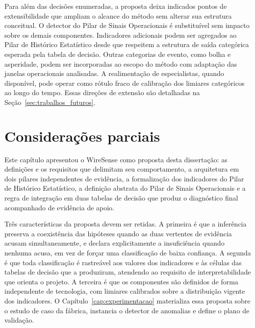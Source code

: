 Para além das decisões enumeradas, a proposta deixa indicados pontos de extensibilidade que ampliam o alcance do método sem alterar sua estrutura conceitual. O detector do Pilar de Sinais Operacionais é substituível sem impacto sobre os demais componentes. Indicadores adicionais podem ser agregados ao Pilar de Histórico Estatístico desde que respeitem a estrutura de saída categórica esperada pela tabela de decisão. Outras categorias de evento, como bolha e asperidade, podem ser incorporadas ao escopo do método com adaptação das janelas operacionais analisadas. A realimentação de especialistas, quando disponível, pode operar como rótulo fraco de calibração dos limiares categóricos ao longo do tempo. Essas direções de extensão são detalhadas na Seção~\ref{sec:trabalhos_futuros}.


\section{Considerações parciais}
\label{sec:consideracoes_cap4}

Este capítulo apresentou o WireSense como proposta desta dissertação: as definições e os requisitos que delimitam seu comportamento, a arquitetura em dois pilares independentes de evidência, a formalização dos indicadores do Pilar de Histórico Estatístico, a definição abstrata do Pilar de Sinais Operacionais e a regra de integração em duas tabelas de decisão que produz o diagnóstico final acompanhado de evidência de apoio.

Três características da proposta devem ser retidas. A primeira é que a inferência preserva a coexistência das hipóteses quando as duas vertentes de evidência acusam simultaneamente, e declara explicitamente a insuficiência quando nenhuma acusa, em vez de forçar uma classificação de baixa confiança. A segunda é que toda classificação é rastreável aos valores dos indicadores e às células das tabelas de decisão que a produziram, atendendo ao requisito de interpretabilidade que orienta o projeto. A terceira é que os componentes são definidos de forma independente de tecnologia, com limiares calibrados sobre a distribuição vigente dos indicadores. O Capítulo~\ref{cap:experimentacao} materializa essa proposta sobre o estudo de caso da fábrica, instancia o detector de anomalias e define o plano de validação.
